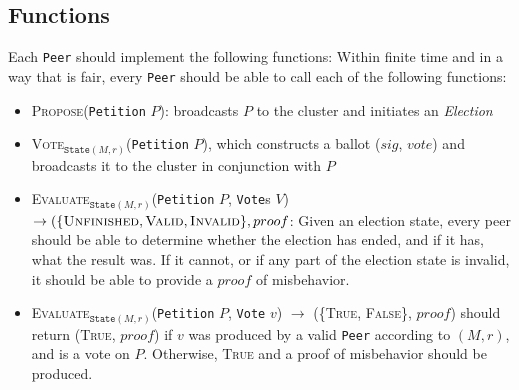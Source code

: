 \subsection{Functions}
Each \texttt{Peer} should implement the following functions:
Within finite time and in a way that is fair, every \texttt{Peer} should be able
to call each of the following functions:
\begin{itemize}
  \item \textsc{Propose}(\texttt{Petition} $P$): broadcasts $P$ to the cluster
    and initiates an \emph{Election}
  \item \textsc{Vote}$_{\texttt{State} (M, r)}$(\texttt{Petition} $P$), which
    constructs a ballot ($sig$, $vote$) and broadcasts it to the cluster in
    conjunction with $P$
  \item \textsc{Evaluate}$_{\texttt{State} (M,r)}$(\texttt{Petition} $P$,
    \texttt{Vote}s $V$) $\to (\{\textsc{Unfinished}, \textsc{Valid},
    \textsc{Invalid}\}, proof$: Given an election state, every peer
    should be able to determine whether the election has ended, and if it has,
    what the result was. If it cannot, or if any part of the election state is
    invalid, it should be able to provide a $proof$ of misbehavior.
  \item \textsc{Evaluate}$_{\texttt{State} (M,r)}$(\texttt{Petition}
    $P$, \texttt{Vote} $v$) $\to$ (\{\textsc{True, False}\}, $proof$) should
    return (\textsc{True}, $proof$) if $v$ was produced by a valid \texttt{Peer}
    according to $(M,r)$, and is a vote on $P$. Otherwise, \textsc{True} and a
    proof of misbehavior should be produced.
\end{itemize}

